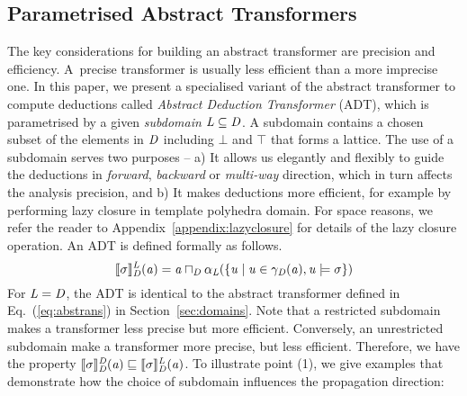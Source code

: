 \subsection{Parametrised Abstract Transformers} \label{sec:abst}
The key considerations for building an abstract transformer are 
precision and efficiency.  A~precise transformer is usually 
less efficient than a more imprecise one.  
In this paper, we present a specialised 
variant of the abstract transformer to compute deductions called 
\emph{Abstract Deduction Transformer} (ADT), which is 
parametrised by a given \emph{subdomain} $\mathit{L}\subseteq \mathit{D}$.  
%
A subdomain contains a chosen subset of the elements in $\mathit{D}$ including
$\bot$ and $\top$ that forms a lattice.
%
The use of a subdomain serves two purposes -- 
  a) It allows us elegantly and flexibly to guide the deductions in 
  {\em forward}, {\em backward} or {\em multi-way} direction, which 
  in turn affects the analysis precision, and 
  b) It makes deductions more efficient, for example by performing lazy closure
  in template polyhedra domain. For space reasons, we refer the reader to 
  Appendix~\ref{appendix:lazyclosure} for details of the lazy closure operation. 
%
An ADT is defined formally  as follows. 
\begin{equation}\label{eq:at2}
\llbracket \sigma \rrbracket_{\mathit{D}}^{\mathit{L}}(\mathit{a})=\mathit{a}\sqcap_{\mathit{D}} \alpha_{\mathit{L}}(\{\mathit{u}\mid \mathit{u}\in\gamma_{\mathit{D}}(\mathit{a}), \mathit{u}\models \sigma\})
\end{equation}
For $\mathit{L}=\mathit{D}$, the ADT is
identical to the abstract transformer defined in
Eq.~(\ref{eq:abstrans}) in Section~\ref{sec:domains}.  Note 
that a restricted subdomain makes a transformer less 
precise but more efficient.  Conversely, an
unrestricted subdomain make a transformer more precise, but less
efficient. Therefore, we have the property
$\llbracket \sigma \rrbracket_{\mathit{D}}^{\mathit{D}}(\mathit{a})\sqsubseteq
\llbracket \sigma \rrbracket_{\mathit{D}}^{\mathit{L}}(\mathit{a})$.
%
To illustrate point (1), 
we give examples that demonstrate how the choice of
subdomain influences the propagation direction:

